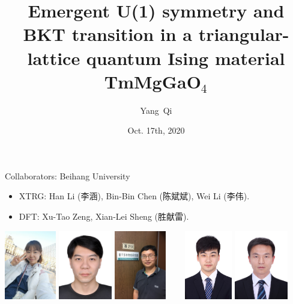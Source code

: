 \documentclass[xcolor=table, aspectratio=1610,ignorenonframetext]{beamer}
\title %
{Emergent U(1) symmetry and BKT transition in a triangular-lattice quantum Ising material TmMgGaO${}_4$}
\author[Y Qi] %
{Yang~Qi}
\institute[Fudan] %
{
Department of Physics, Fudan University.
}
\date{Oct. 17th, 2020}
\begin{document}
\begin{frame}
  \titlepage
\end{frame}

\begin{frame}{Collaborators: Beihang University}
\begin{itemize}
	\item XTRG: Han Li (李涵), Bin-Bin Chen (陈斌斌), Wei Li (李伟).
	\item DFT: Xu-Tao Zeng, Xian-Lei Sheng (胜献雷).
\end{itemize}
	\begin{center}
		\includegraphics[height=3cm]{../people/hanli}
		\includegraphics[height=3cm]{../people/binbinchen}
		\includegraphics[height=3cm]{../people/weili}~~~~
		\includegraphics[height=3cm]{../people/xutaozeng}
		\includegraphics[height=3cm]{../people/xianleisheng}
	\end{center}
\end{frame}
\end{document}

